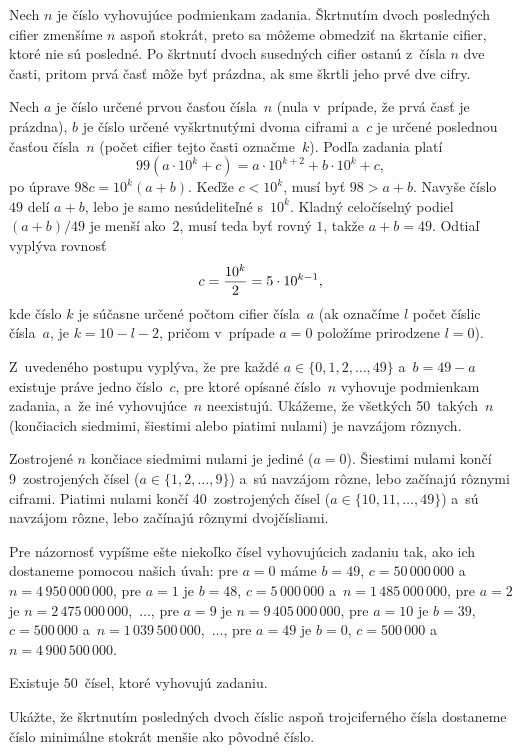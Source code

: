 {%
Nech $n$ je číslo vyhovujúce podmienkam zadania. Škrtnutím dvoch posledných
cifier zmenšíme $n$ aspoň stokrát,
preto sa môžeme obmedziť na škrtanie cifier, ktoré nie sú posledné.
Po škrtnutí dvoch susedných cifier ostanú z~čísla $n$ dve časti,
pritom prvá časť môže byť prázdna, ak sme škrtli jeho prvé dve cifry.

Nech $a$ je číslo určené prvou časťou čísla~$n$ (nula v~prípade, že
prvá časť je prázdna), $b$ je číslo určené vyškrtnutými dvoma ciframi
a~$c$ je určené poslednou časťou čísla~$n$ (počet cifier tejto časti označme~$k$).
Podľa zadania platí
$$
99(a\cdot 10^k + c) = a\cdot 10^{k+2}+b\cdot 10^k+c,
$$
po úprave $98c = 10^k(a+b)$. Keďže $c < 10^k$, musí byť $98 > a+b$.
Navyše číslo~$49$ delí $a+b$, lebo je samo nesúdeliteľné s~$10^k$.
Kladný celočíselný podiel $(a+b)/49$ je menší ako~$2$, musí teda byť rovný
$1$, takže $a+b=49$. Odtiaľ vyplýva rovnosť
$$
c = {10^k\over 2} = 5\cdot 10^{k-1},
$$
kde číslo $k$ je súčasne určené počtom cifier čísla~$a$
(ak označíme $l$ počet číslic čísla~$a$, je $k=10-l-2$, pričom v~prípade $a=0$
položíme prirodzene $l=0$).

Z~uvedeného postupu vyplýva, že pre každé $a\in\{0,1,2,\dots,49\}$
a~$b=49-a$ existuje  práve jedno číslo~$c$, pre ktoré opísané
číslo~$n$ vyhovuje podmienkam zadania, a~že iné vyhovujúce~$n$ neexistujú.
Ukážeme, že všetkých 50~takých~$n$
(končiacich siedmimi, šiestimi alebo piatimi nulami) je navzájom rôznych.

Zostrojené $n$ končiace siedmimi nulami je jediné ($a=0$). Šiestimi
nulami končí 9~zostrojených čísel ($a\in\{1,2,\dots,9\}$)
a~sú navzájom rôzne, lebo začínajú rôznymi ciframi. Piatimi
nulami končí 40~zostrojených čísel ($a\in\{10,11,\dots,49\}$)
a~sú navzájom rôzne, lebo začínajú rôznymi dvojčísliami.

Pre názornosť  vypíšme ešte niekoľko čísel vyhovujúcich zadaniu tak, ako ich
dostaneme pomocou našich úvah:
pre $a=0$ máme $b=49$, $c=50\,000\,000$ a~$n=4\,950\,000\,000$, pre $a=1$ je $b=48$,
$c=5\,000\,000$ a~$n=1\,485\,000\,000$,
pre $a=2$ je $n=2\,475\,000\,000$,~$\dots$,
pre $a=9$ je $n=9\,405\,000\,000$,
pre $a=10$ je $b=39$, $c=500\,000$ a~$n=1\,039\,500\,000$,~$\dots$,
pre $a=49$ je $b=0$, $c=500\,000$ a~$n=4\,900\,500\,000$.

\zaver
Existuje $50$~čísel, ktoré vyhovujú zadaniu.

Ukážte, že škrtnutím posledných dvoch číslic aspoň trojciferného čísla
dostaneme číslo minimálne
stokrát menšie ako pôvodné číslo.

}
